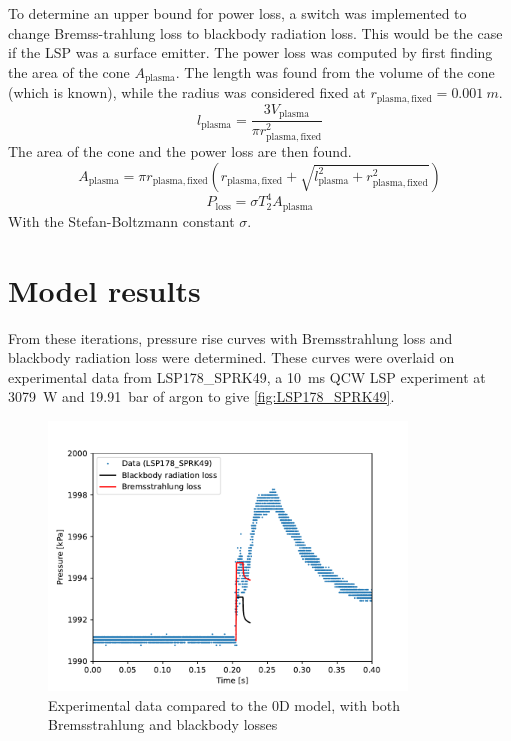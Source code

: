         To determine an upper bound for power loss, a switch was implemented to change Bremss-trahlung loss to blackbody radiation loss. This would be the case if the LSP was a surface emitter. The power loss was computed by first finding the area of the cone $A_\mathrm{plasma}$. The length was found from the volume of the cone (which is known), while the radius was considered fixed at $r_\mathrm{plasma, fixed} = \qty{0.001}{m}$.
        \begin{equation}
            l_\mathrm{plasma} = \frac{3 V_\mathrm{plasma}}{\pi r_\mathrm{plasma, fixed}^2}
        \end{equation}
        The area of the cone and the power loss are then found. 
        \begin{equation}
            A_\mathrm{plasma} = \pi r_\mathrm{plasma, fixed} ( r_\mathrm{plasma, fixed} + \sqrt{l_\mathrm{plasma}^2 + r_\mathrm{plasma, fixed}^2})
        \end{equation}
        \begin{equation}
            P_\mathrm{loss} = \sigma T_2^4 A_\mathrm{plasma}
        \end{equation}
        With the Stefan-Boltzmann constant $\sigma$.
    \section{Model results}

        From these iterations, pressure rise curves with Bremsstrahlung loss and blackbody radiation loss were determined. These curves were overlaid on experimental data from LSP178\_SPRK49, a \qty{10}{ms} QCW LSP experiment at \qty{3079}{W} and \qty{19.91}{bar} of argon to give \autoref{fig:LSP178_SPRK49}.
        
        \begin{figure}[!ht]
            \centering
            \includegraphics[width=0.85\textwidth]{assets/2 models/LSP178_SPRK49.pdf}
            \caption{Experimental data compared to the 0D model, with both Bremsstrahlung and blackbody losses}
            \label{fig:LSP178_SPRK49}
        \end{figure}
        
